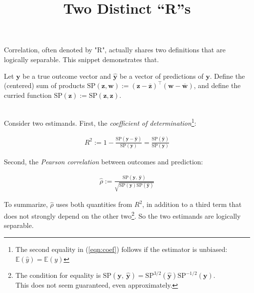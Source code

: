 \documentclass{article}
\title{Two Distinct ``R''s}
\author{}
\date{}
\begin{document}
\maketitle

Correlation, often denoted by "R", actually shares two definitions that are logically separable. This snippet demonstrates that.

Let $\mathbf{y}$ be a true outcome vector and $\widehat{\mathbf{y}}$ be a vector of predictions of $\mathbf{y}$. Define the (centered) sum of products $\text{SP}(\mathbf{z}, \mathbf{w}) := (\mathbf{z}-\overline{\mathbf{z}})^\top(\mathbf{w}-\overline{\mathbf{w}})$, and define the curried function $\text{SP}(\mathbf{z}) := \text{SP}(\mathbf{z}, \mathbf{z})$.

\ \\

Consider two estimands. First, the \emph{coefficient of determination}\footnote{The second equality in (\ref{eqn:coef}) follows if the estimator is unbiased: $\mathbb{E}(\widehat{y}) = \mathbb{E}(y)$}:

\begin{align}
    R^2 := 1 - \frac{\text{SP}(\mathbf{y}-\widehat{\mathbf{y}})}{\text{SP}(\mathbf{y})} = \frac{\text{SP}(\widehat{\mathbf{y}})}{\text{SP}(\mathbf{y})} \label{eqn:coef}
\end{align}

Second, the \emph{Pearson correlation} between outcomes and prediction:

\begin{align}
    \widehat{\rho} := \frac{\text{SP}(\mathbf{y},\  \widehat{\mathbf{y}})}{\sqrt{\text{SP}(\mathbf{y})\text{SP}(\widehat{\mathbf{y}})}}
\end{align}


To summarize, $\widehat{\rho}$ uses both quantities from $R^2$, in addition to a third term that does not strongly depend on the other two\footnote{The condition for equality is $\text{SP}(\mathbf{y},\  \widehat{\mathbf{y}}) = \text{SP}^{3/2}(\widehat{\mathbf{y}})\text{SP}^{-1/2}(\mathbf{y})$. \\This does not seem guaranteed, even approximately.}. So the two estimands are logically separable.
\end{document}
